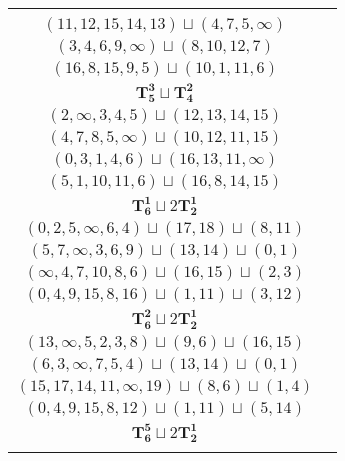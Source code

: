 \documentclass{article}
\begin{document}
\begin{longtable}{|c|c|}
\begin{tabular}{c}
        $(15,13,12,9,7)\sqcup(3,\infty,4,5)$ \\ 
        $(11,12,15,14,13)\sqcup(4,7,5,\infty)$ \\ 
        $(3,4,6,9,\infty)\sqcup(8,10,12,7)$ \\ 
        $(16,8,15,9,5)\sqcup(10,1,11,6)$
        \end{tabular} \\ 
        \hline
        $\mathbf{T_{5}^{3}} \sqcup \mathbf{T_{4}^{2}}$ & \begin{tabular}{c}
        $(0,2,3,4,5)\sqcup(9,8,11,\infty)$ \\ 
        $(2,\infty,3,4,5)\sqcup(12,13,14,15)$ \\ 
        $(4,7,8,5,\infty)\sqcup(10,12,11,15)$ \\ 
        $(0,3,1,4,6)\sqcup(16,13,11,\infty)$ \\ 
        $(5,1,10,11,6)\sqcup(16,8,14,15)$
        \end{tabular} \\ 
        \hline
        $\mathbf{T_{6}^{1}} \sqcup 2\mathbf{T_{2}^{1}}$ & \begin{tabular}{c}
        $(3,5,4,2,\infty,1)\sqcup(19,20)\sqcup(12,15)$ \\ 
        $(0,2,5,\infty,6,4)\sqcup(17,18)\sqcup(8,11)$ \\ 
        $(5,7,\infty,3,6,9)\sqcup(13,14)\sqcup(0,1)$ \\ 
        $(\infty,4,7,10,8,6)\sqcup(16,15)\sqcup(2,3)$ \\ 
        $(0,4,9,15,8,16)\sqcup(1,11)\sqcup(3,12)$
        \end{tabular} \\ 
        \hline
        $\mathbf{T_{6}^{2}} \sqcup 2\mathbf{T_{2}^{1}}$ & \begin{tabular}{c}
        $(\infty,2,4,5,8,0)\sqcup(18,20)\sqcup(12,13)$ \\ 
        $(13,\infty,5,2,3,8)\sqcup(9,6)\sqcup(16,15)$ \\ 
        $(6,3,\infty,7,5,4)\sqcup(13,14)\sqcup(0,1)$ \\ 
        $(15,17,14,11,\infty,19)\sqcup(8,6)\sqcup(1,4)$ \\ 
        $(0,4,9,15,8,12)\sqcup(1,11)\sqcup(5,14)$
        \end{tabular} \\ 
        \hline
        $\mathbf{T_{6}^{5}} \sqcup 2\mathbf{T_{2}^{1}}$ & \begin{tabular}{c}
        $(3,2,4,5,0,1)\sqcup(18,15)\sqcup(11,14)$ \\ 

\end{tabular}
\end{longtable}
\end{document}
